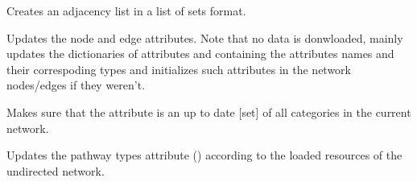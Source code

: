 \documentclass[letterpaper,10pt,english]{sphinxmanual}
\begin{document}
\begin{fulllineitems}

\begin{fulllineitems}
\label{\detokenize{main:pypath.main.PyPath.update_adjlist}}
Creates an adjacency list in a list of sets format.

\end{fulllineitems}


\begin{fulllineitems}
\label{\detokenize{main:pypath.main.PyPath.update_attrs}}
Updates the node and edge attributes. Note that no data is
donwloaded, mainly updates the dictionaries of attributes
 and
 containing the
attributes names and their correspoding types and initializes
such attributes in the network nodes/edges if they weren’t.

\end{fulllineitems}


\begin{fulllineitems}
\label{\detokenize{main:pypath.main.PyPath.update_cats}}
Makes sure that the 
attribute is an up to date {[}set{]} of all categories in the
current network.

\end{fulllineitems}


\begin{fulllineitems}
\label{\detokenize{main:pypath.main.PyPath.update_db_dict}}
\end{fulllineitems}


\begin{fulllineitems}
\label{\detokenize{main:pypath.main.PyPath.update_pathway_types}}
Updates the pathway types attribute
() according to the
loaded resources of the undirected network.


\end{fulllineitems}
\end{fulllineitems}
\end{document}
